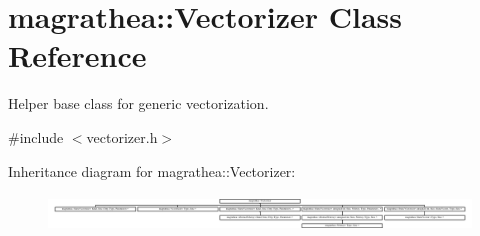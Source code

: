 \hypertarget{classmagrathea_1_1Vectorizer}{\section{magrathea\-:\-:Vectorizer Class Reference}
\label{classmagrathea_1_1Vectorizer}
}


Helper base class for generic vectorization.  




{\ttfamily \#include $<$vectorizer.\-h$>$}

Inheritance diagram for magrathea\-:\-:Vectorizer\-:\begin{figure}[H]
\begin{center}
\leavevmode
\includegraphics[height=0.955224cm]{classmagrathea_1_1Vectorizer}
\end{center}
\end{figure}
